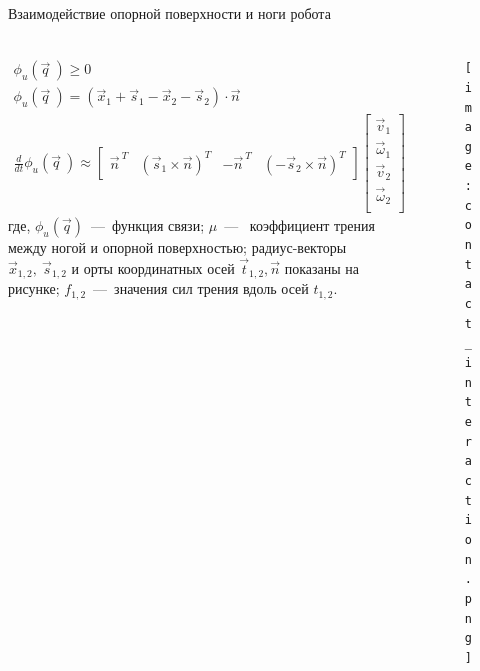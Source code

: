 \begin{frame}[t]{Взаимодействие опорной поверхности и ноги робота}
    \framesubtitle{}
    \begin{columns}[T,onlytextwidth]
        \begin{column}{0.69\textwidth}
            \begin{align}
                \phi_u(\vec{q}\ ) \geqslant 0                                                     \\
                \phi_u(\vec{q}\ ) = (\vec{x}_1 + \vec{s}_1 - \vec{x}_2 - \vec{s}_2) \cdot \vec{n} \\
                \frac{d }{d t}\phi_u(\vec{q}\ ) \approx \begin{bmatrix}
                                                            \vec{n}^{\ T} & (\vec{s}_1 \times \vec{n})^T & -\vec{n}^{\ T} & (-\vec{s}_2 \times \vec{n})^T
                                                        \end{bmatrix} \begin{bmatrix}
                                                                          \vec{v}_1      \\
                                                                          \vec{\omega}_1 \\
                                                                          \vec{v}_2      \\
                                                                          \vec{\omega}_2 \\
                                                                      \end{bmatrix}
            \end{align}
            где, $\phi_u(\vec{q})$~---~функция связи; $ \mu $~---~ коэффициент трения между ногой и опорной поверхностью;  радиус-векторы $\vec{x}_{1,2},\ \vec{s}_{1,2}$ и орты координатных осей $\vec{t}_{1,2}, \vec{n}$ показаны на рисунке; $ f_{1,2} $~---~значения сил трения вдоль осей $t_{1,2}$.
        \end{column}
        \begin{column}{0.29\textwidth}
            \vspace{-0.4cm}
            \begin{figure}[H]
                \centering\texttt{[image: contact\_interaction.png]}
            \end{figure}
            \vspace{-1cm}
            \begin{align}

\end{align}
\end{column}
\end{columns}
\end{frame}
